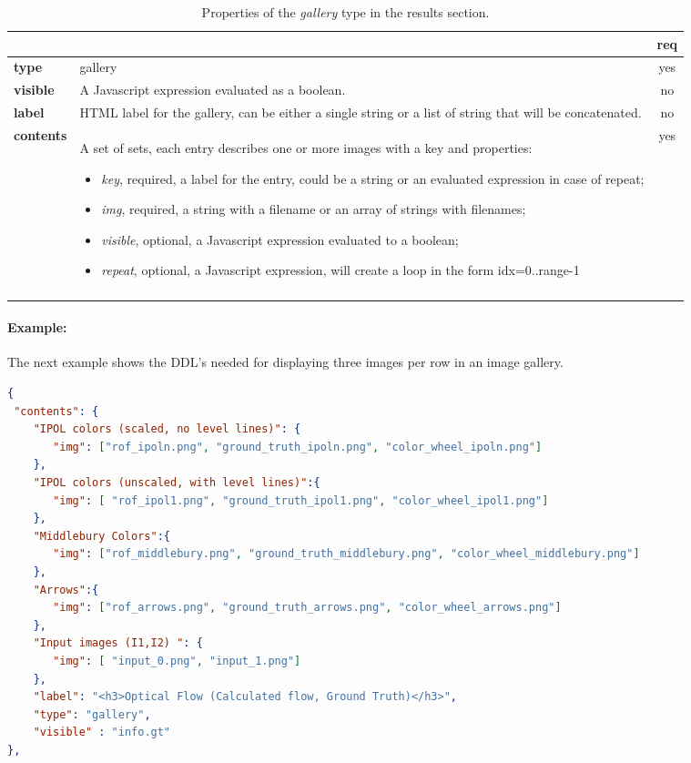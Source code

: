 \begin{longtable}{|>{\bf}L{\linewidth}|L{\linewidth}|c|}
\hline
      &  & {\bf req} 
\tabularnewline \hline \hline
 type       & gallery  & yes \\ \hline
 visible    & A Javascript expression evaluated as a boolean. & no \\ \hline
 label      & HTML label for the gallery, can be either a single string or 
             a list of string that will be concatenated. & no \\ \hline
 contents   & A set of sets, each entry describes one or more images with a key and properties:
\vspace{-1em}
\begin{itemize}
    \setlength\itemsep{-0.5em}
    \item \textit{key}, required, a label for the entry, could be a string or an evaluated expression in case of repeat;
    \item \textit{img}, required, a string with a filename or an array of strings with filenames;
    \item \textit{visible}, optional, a Javascript expression evaluated to a boolean;
    \item \textit{repeat}, optional, a Javascript expression, will create a loop in the form idx=0..range-1
\end{itemize} 
\vspace{-1em} & yes \\ \hline
\caption{Properties of the \emph{gallery} type in the results section.}
\end{longtable}

\paragraph{Example:}
The next example shows the DDL's needed for displaying three images per row in an image gallery.
\begin{lstlisting}[language=json,firstnumber=1]
{
 "contents": {
    "IPOL colors (scaled, no level lines)": {
       "img": ["rof_ipoln.png", "ground_truth_ipoln.png", "color_wheel_ipoln.png"]
    },
    "IPOL colors (unscaled, with level lines)":{
       "img": [ "rof_ipol1.png", "ground_truth_ipol1.png", "color_wheel_ipol1.png"]
    },
    "Middlebury Colors":{
       "img": ["rof_middlebury.png", "ground_truth_middlebury.png", "color_wheel_middlebury.png"]
    },
    "Arrows":{
       "img": ["rof_arrows.png", "ground_truth_arrows.png", "color_wheel_arrows.png"]
    },
    "Input images (I1,I2) ": {
       "img": [ "input_0.png", "input_1.png"]
    },
    "label": "<h3>Optical Flow (Calculated flow, Ground Truth)</h3>", 
    "type": "gallery",
    "visible" : "info.gt"
},
\end{lstlisting}

